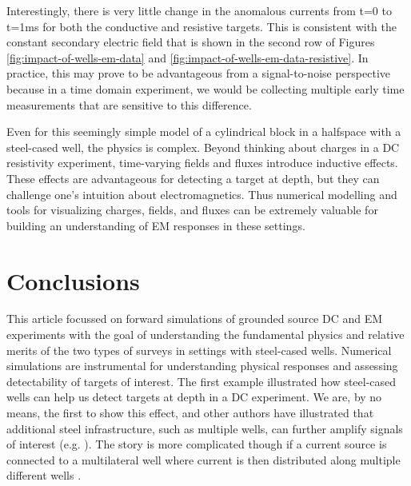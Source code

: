 \documentclass[
    paper
]{geophysics}
\begin{document}
Interestingly, there is very little change in the anomalous currents from t=0 to t=1ms for both the conductive and resistive targets. This is consistent with the constant secondary electric field that is shown in the second row of Figures \ref{fig:impact-of-wells-em-data} and \ref{fig:impact-of-wells-em-data-resistive}. In practice, this may prove to be advantageous from a signal-to-noise perspective because in a time domain experiment, we would be collecting multiple early time measurements that are sensitive to this difference.





Even for this seemingly simple model of a cylindrical block in a halfspace with a steel-cased well, the physics is complex. Beyond thinking about charges in a DC resistivity experiment, time-varying fields and fluxes introduce inductive effects. These effects are advantageous for detecting a target at depth, but they can challenge one’s intuition about electromagnetics. Thus numerical modelling and tools for visualizing charges, fields, and fluxes can be extremely valuable for building an understanding of EM responses in these settings.



\section{Conclusions}

This article focussed on forward simulations of grounded source DC and EM experiments with the goal of understanding the fundamental physics and relative merits of the two types of surveys in settings with steel-cased wells. Numerical simulations are instrumental for understanding physical responses and assessing detectability of targets of interest. The first example illustrated how steel-cased wells can help us detect targets at depth in a DC experiment. We are, by no means, the first to show this effect, and other authors have illustrated that additional steel infrastructure, such as multiple wells, can further amplify signals of interest (e.g. \cite{Yang2019}). The story is more complicated though if a current source is connected to a multilateral well where current is then distributed along multiple different wells \citep{Weiss2017}.
\end{document}
